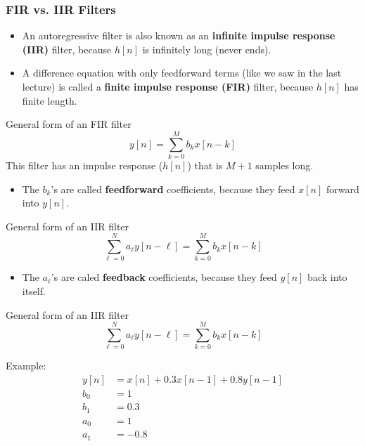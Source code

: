 \documentclass{beamer}
\begin{document}
\begin{frame}
  \frametitle{FIR vs. IIR Filters}

  \begin{itemize}
  \item An autoregressive filter is also known as an {\bf infinite
    impulse response (IIR)} filter, because $h[n]$ is infinitely long
    (never ends).
  \item A difference equation with only feedforward terms (like we saw
    in the last lecture) is called a {\bf finite impulse response
      (FIR)} filter, because $h[n]$ has finite length.
  \end{itemize}
\end{frame}

\begin{frame}
  \begin{block}{General form of an FIR filter}
    \[
    y[n] = \sum_{k=0}^{M} b_k x[n-k]
    \]
    This filter has an impulse response ($h[n]$) that is $M+1$ samples
    long.
    \begin{itemize}
    \item The $b_k$'s are called {\bf feedforward}
      coefficients, because they feed $x[n]$ forward into $y[n]$.
    \end{itemize}
  \end{block}
  \begin{block}{General form of an IIR filter}
    \[
    \sum_{\ell=0}^N a_\ell y[n-\ell] = \sum_{k=0}^{M} b_k x[n-k]
    \]
    \begin{itemize}
    \item %
      The $a_\ell$'s are caled
      {\bf feedback} coefficients, because they feed $y[n]$ back into
      itself.
    \end{itemize}
  \end{block}
\end{frame}

\begin{frame}
  \begin{block}{General form of an IIR filter}
    \[
    \sum_{\ell=0}^N a_\ell y[n-\ell] = \sum_{k=0}^{M} b_k x[n-k]
    \]
  \end{block}
  Example:
  \begin{align*}
    y[n] &= x[n] + 0.3 x[n-1] +  0.8 y[n-1]\\
    b_0 &= 1\\
    b_1 &= 0.3\\
    a_0 &= 1\\
    a_1 &= -0.8
  \end{align*}
\end{frame}
\end{document}
